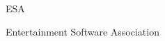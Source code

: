 \documentclass[tg]{mdtuffs}
\begin{document}

\begin{listofabbrv}{ESA}
\item [ESA] Entertainment Software Association    
    
\end{listofabbrv}



\tableofcontents


\setlength{\baselineskip}{1.5\baselineskip}






\setlength{\baselineskip}{\baselineskip}

%


\end{document}
